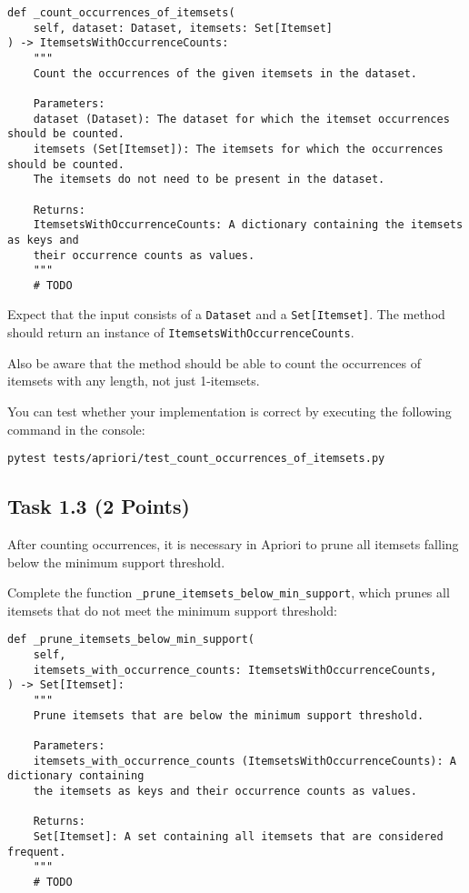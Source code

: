 \documentclass[
english,
smallborders
]{i6prcsht}
\newcommand{\points}[1]{\hfill \color{red}(#1 Points)\color{black}}
\begin{document}
\vspace*{0.3cm}

\begin{lstlisting}
def _count_occurrences_of_itemsets(
	self, dataset: Dataset, itemsets: Set[Itemset]
) -> ItemsetsWithOccurrenceCounts:
	"""
    Count the occurrences of the given itemsets in the dataset.

	Parameters:
	dataset (Dataset): The dataset for which the itemset occurrences should be counted.
	itemsets (Set[Itemset]): The itemsets for which the occurrences should be counted.
	The itemsets do not need to be present in the dataset.

	Returns:
	ItemsetsWithOccurrenceCounts: A dictionary containing the itemsets as keys and
	their occurrence counts as values.
	"""
	# TODO
\end{lstlisting}

\vspace*{0.1cm}

Expect that the input consists of a \texttt{Dataset} and a \texttt{Set[Itemset]}. The method should return an instance of \texttt{ItemsetsWithOccurrenceCounts}.

Also be aware that the method should be able to count the occurrences of itemsets with any length, not just 1-itemsets.

You can test whether your implementation is correct by executing the following command in the console:

\vspace*{0.3cm}

\begin{lstlisting}
pytest tests/apriori/test_count_occurrences_of_itemsets.py
\end{lstlisting}

\vspace*{0.1cm}

\subsection*{Task 1.3 \points{2}}

After counting occurrences, it is necessary in Apriori to prune all itemsets falling below the minimum support threshold.

Complete the function \texttt{\_prune\_itemsets\_below\_min\_support}, which prunes all itemsets that do not meet the minimum support threshold:

\vspace*{0.3cm}

\begin{lstlisting}
def _prune_itemsets_below_min_support(
	self,
	itemsets_with_occurrence_counts: ItemsetsWithOccurrenceCounts,
) -> Set[Itemset]:
	"""
	Prune itemsets that are below the minimum support threshold.

	Parameters:
	itemsets_with_occurrence_counts (ItemsetsWithOccurrenceCounts): A dictionary containing
	the itemsets as keys and their occurrence counts as values.

	Returns:
	Set[Itemset]: A set containing all itemsets that are considered frequent.
	"""
 	# TODO
\end{lstlisting}
\end{document}
